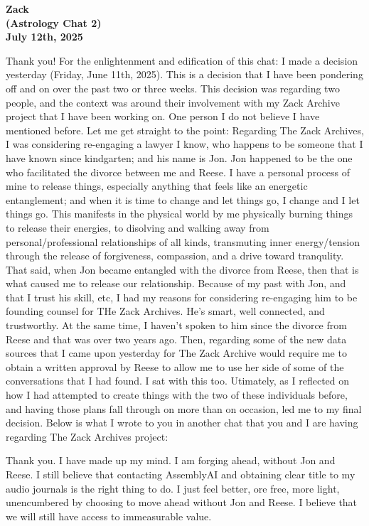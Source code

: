 \documentclass{article}
\begin{document}
\begin{center}
\textbf{Zack} \\
\textbf{(Astrology Chat 2)} \\
\textbf{July 12th, 2025}
\end{center}

\medskip

Thank you! For the enlightenment and edification of this chat: I made a
decision yesterday (Friday, June 11th, 2025). This is a decision that I
have been pondering off and on over the past two or three weeks. This
decision was regarding two people, and the context was around their
involvement with my Zack Archive project that I have been working on.
One person I do not believe I have mentioned before. Let me get straight
to the point: Regarding The Zack Archives, I was considering re-engaging
a lawyer I know, who happens to be someone that I have known since
kindgarten; and his name is Jon. Jon happened to be the one who
facilitated the divorce between me and Reese. I have a personal process
of mine to release things, especially anything that feels like an
energetic entanglement; and when it is time to change and let things go,
I change and I let things go. This manifests in the physical world by me
physically burning things to release their energies, to disolving and
walking away from personal/professional relationships of all kinds,
transmuting inner energy/tension through the release of forgiveness,
compassion, and a drive toward tranqulity. That said, when Jon became
entangled with the divorce from Reese, then that is what caused me to
release our relationship. Because of my past with Jon, and that I trust
his skill, etc, I had my reasons for considering re-engaging him to be
founding counsel for THe Zack Archives. He's smart, well connected, and
trustworthy. At the same time, I haven't spoken to him since the divorce
from Reese and that was over two years ago. Then, regarding some of the
new data sources that I came upon yesterday for The Zack Archive would
require me to obtain a written approval by Reese to allow me to use her
side of some of the conversations that I had found. I sat with this too.
Utimately, as I reflected on how I had attempted to create things with
the two of these individuals before, and having those plans fall through
on more than on occasion, led me to my final decision. Below is what I
wrote to you in another chat that you and I are having regarding The
Zack Archives project:

Thank you. I have made up my mind. I am forging ahead, without Jon and
Reese. I still believe that contacting AssemblyAI and obtaining clear
title to my audio journals is the right thing to do. I just feel better,
ore free, more light, unencumbered by choosing to move ahead without Jon
and Reese. I believe that we will still have access to immeasurable
value.
\end{document}
